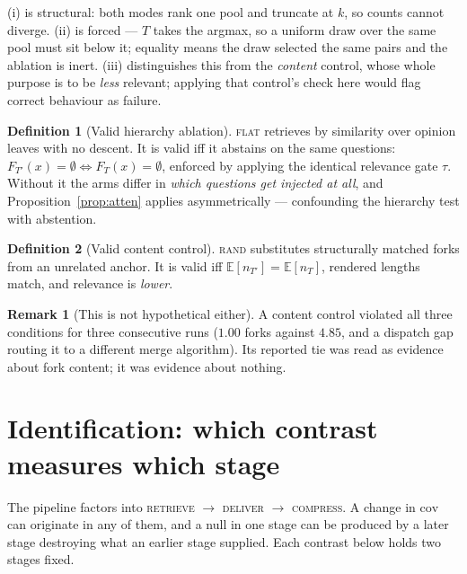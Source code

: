 \documentclass[11pt]{article}
\theoremstyle{definition}
\newtheorem{definition}{Definition}
\newtheorem{remark}{Remark}
\newcommand{\cov}{\mathrm{cov}}
\newcommand{\E}{\mathbb{E}}
\newcommand{\1}{\mathbf{1}}
\begin{document}
(i) is structural: both modes rank one pool and truncate at $k$, so counts cannot
diverge. (ii) is forced --- $T$ takes the argmax, so a uniform draw over the same
pool must sit below it; equality means the draw selected the same pairs and the
ablation is inert. (iii) distinguishes this from the \emph{content} control,
whose whole purpose is to be \emph{less} relevant; applying that control's check
here would flag correct behaviour as failure.

\begin{definition}[Valid hierarchy ablation]
\textsc{flat} retrieves by similarity over opinion leaves with no descent. It is
valid iff it abstains on the same questions: $F_{T'}(x) = \emptyset \iff
F_T(x) = \emptyset$, enforced by applying the identical relevance gate $\tau$.
Without it the arms differ in \emph{which questions get injected at all}, and
Proposition~\ref{prop:atten} applies asymmetrically --- confounding the
hierarchy test with abstention.
\end{definition}

\begin{definition}[Valid content control]
\textsc{rand} substitutes structurally matched forks from an unrelated anchor. It
is valid iff $\E[n_{T'}] = \E[n_T]$, rendered lengths match, and relevance is
\emph{lower}.
\end{definition}

\begin{remark}[This is not hypothetical either]
A content control violated all three conditions for three consecutive runs
($1.00$ forks against $4.85$, and a dispatch gap routing it to a different merge
algorithm). Its reported tie was read as evidence about fork content; it was
evidence about nothing.
\end{remark}

\section{Identification: which contrast measures which stage}

The pipeline factors into \textsc{retrieve} $\to$ \textsc{deliver} $\to$
\textsc{compress}. A change in $\cov$ can originate in any of them, and a null in
one stage can be produced by a later stage destroying what an earlier stage
supplied. Each contrast below holds two stages fixed.
\end{document}
